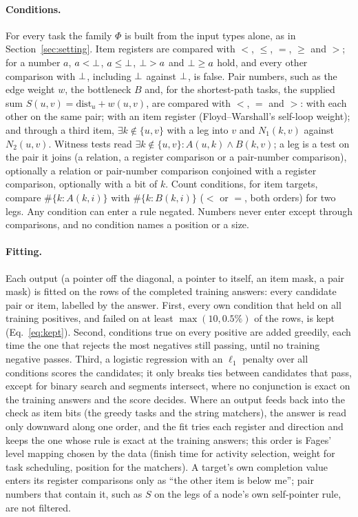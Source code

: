 \paragraph{Conditions.} For every task the family $\Phi$ is built from the input types alone, as in
Section~\ref{sec:setting}. Item registers are compared with $<$, $\leq$, $=$, $\geq$ and $>$; for a number $a$, $a<\bot$,
$a\leq\bot$, $\bot>a$ and $\bot\geq a$ hold, and every other comparison with $\bot$, including $\bot$
against $\bot$, is false. Pair numbers, such as the edge weight $w$, the bottleneck $B$ and, for the shortest-path
tasks, the supplied sum $S(u,v) = \mathrm{dist}_u + w(u,v)$, are compared with $<$, $=$ and $>$: with each other on the
same pair; with an item register (Floyd--Warshall's self-loop weight); and through a third item, $\exists
k\notin\{u,v\}$ with a leg into $v$ and $N_1(k,v)$ against $N_2(u,v)$. Witness tests read $\exists k\notin\{u,v\}:
A(u,k)\wedge B(k,v)$; a leg is a test on the pair it joins (a relation, a register comparison or a pair-number
comparison), optionally a relation or pair-number comparison conjoined with a register comparison, optionally with a bit
of $k$. Count conditions, for item targets, compare $\#\{k : A(k,i)\}$ with $\#\{k : B(k,i)\}$ ($<$ or $=$, both orders)
for two legs. Any condition can enter a rule negated. Numbers never enter except through comparisons, and no condition
names a position or a size.

\paragraph{Fitting.} Each output (a pointer off the diagonal, a pointer to itself, an item mask, a pair mask) is fitted
on the rows of the completed training answers: every candidate pair or item, labelled by the answer. First, every own
condition that held on all training positives, and failed on at least $\max(10, 0.5\%)$ of the rows, is kept
(Eq.~\ref{eq:kept}). Second, conditions true on every positive are added greedily, each time the one that rejects the
most negatives still passing, until no training negative passes\cite{haussler1988quantifying}. Third, a logistic
regression with an $\ell_1$ penalty over all conditions scores the candidates; it only breaks ties between candidates
that pass, except for binary search and segments intersect, where no conjunction is exact on the training answers and
the score decides. Where an output feeds back into the check as item bits (the greedy tasks and the string matchers),
the answer is read only downward along one order, and the fit tries each register and direction and keeps the one
whose rule is exact at the training answers; this order is Fages' level mapping chosen by the data (finish time for
activity selection, weight for task scheduling, position for the matchers). A target's own completion value enters its register comparisons only as ``the other
item is below me''; pair numbers that contain it, such as $S$ on the legs of a node's own self-pointer rule, are not
filtered.

